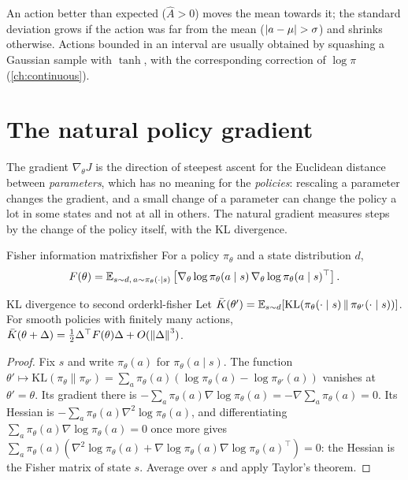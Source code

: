 An action better than expected ($\hat A > 0$) moves the mean towards it;
the standard deviation grows if the action was far from the mean
($\left\lvert a - \mu \right\rvert > \sigma$) and shrinks otherwise. Actions bounded in an
interval are usually obtained by squashing a Gaussian sample with $\tanh$,
with the corresponding correction of $\log \pi$ (\cref{ch:continuous}).

\section{The natural policy gradient}

The gradient $\nabla_\theta J$ is the direction of steepest ascent for the
Euclidean distance between \emph{parameters}, which has no meaning for the
\emph{policies}: rescaling a parameter changes the gradient, and a small
change of a parameter can change the policy a lot in some states and not at
all in others. The natural gradient measures steps by the change of the
policy itself, with the KL divergence.

\begin{definition}{Fisher information matrix}{fisher}
  For a policy $\pi_\theta$ and a state distribution $d$,
  \begin{equation}
    F(\theta) = \mathbb{E}_{s \sim d,\, a \sim \pi_\theta(\cdot \mid s)}\left[
    \nabla_\theta \log \pi_\theta(a \mid s)\, \nabla_\theta \log
    \pi_\theta(a \mid s)^\top \right].
  \end{equation}
\end{definition}

\begin{proposition}{KL divergence to second order}{kl-fisher}
  Let $\bar K(\theta') = \mathbb{E}_{s \sim d}[\mathrm{KL}(\pi_\theta(\cdot \mid
  s) \,\|\, \pi_{\theta'}(\cdot \mid s))]$. For smooth policies with
  finitely many actions, $\bar K(\theta + \Delta) = \frac{1}{2}
  \Delta^\top F(\theta) \Delta + O(\left\lVert \Delta \right\rVert^3)$.
\end{proposition}

\begin{proof}
  Fix $s$ and write $\pi_\theta(a)$ for $\pi_\theta(a \mid s)$. The function
  $\theta' \mapsto \mathrm{KL}(\pi_\theta \| \pi_{\theta'}) = \sum_a
  \pi_\theta(a) (\log \pi_\theta(a) - \log \pi_{\theta'}(a))$ vanishes
  at $\theta' = \theta$. Its gradient there is $-\sum_a \pi_\theta(a)
  \nabla \log \pi_\theta(a) = -\nabla \sum_a \pi_\theta(a) = 0$. Its
  Hessian is $-\sum_a \pi_\theta(a) \nabla^2 \log \pi_\theta(a)$, and
  differentiating $\sum_a \pi_\theta(a) \nabla \log \pi_\theta(a) = 0$
  once more gives $\sum_a \pi_\theta(a) \left( \nabla^2 \log
  \pi_\theta(a) + \nabla \log \pi_\theta(a) \nabla \log
  \pi_\theta(a)^\top \right) = 0$: the Hessian is the Fisher matrix of
  state $s$. Average over $s$ and apply Taylor's theorem.
\end{proof}

